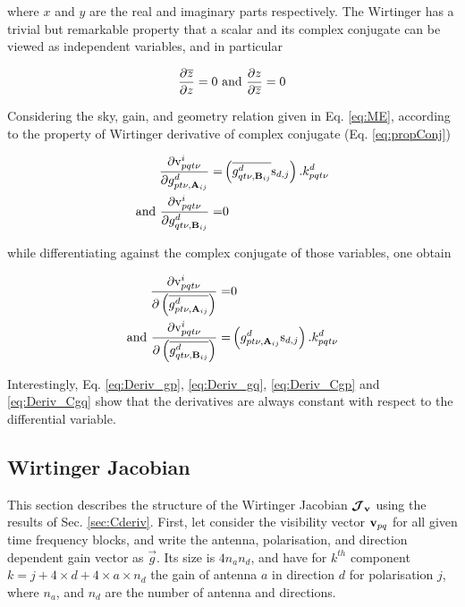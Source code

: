 \noindent where $x$ and $y$ are the real and imaginary parts
respectively. The
Wirtinger has a trivial but remarkable property that a scalar and its
complex conjugate can be viewed as independent variables, and in
particular


\begin{equation}
\label{eq:propConj}
\frac{\partial \overline{z}}{\partial z}=0
\text{ and }
\frac{\partial z}{\partial \overline{z}}=0
\end{equation}


Considering the sky, gain, and geometry relation given in
Eq. \ref{eq:ME}, according to the property of Wirtinger derivative of complex
conjugate (Eq. \ref{eq:propConj})

\begin{alignat}{3}
\label{eq:Deriv_gp}
\frac{\partial \mathrm{v}^i_{pqt\nu}}{\partial g^{d}_{pt\nu,\textbf{A}_{ij}}}=&
\left(\conj{g^{d}_{qt\nu,\textbf{B}_{ij}}}\text{s}_{d,j}\right).k^{d}_{pqt\nu}\\
\label{eq:Deriv_gq}
\text{and}\ 
\frac{\partial \mathrm{v}^i_{pqt\nu}}{\partial g^{d}_{qt\nu,\textbf{B}_{ij}}}=&0
\end{alignat}

\noindent while differentiating against the complex conjugate of those
variables, one obtain

\begin{alignat}{3}
\label{eq:Deriv_Cgp}
\frac{\partial \mathrm{v}^i_{pqt\nu}}{\partial \conjp{g^{d}_{pt\nu,\textbf{A}_{ij}}}}=&0\\
\label{eq:Deriv_Cgq}
\text{and}\ 
\frac{\partial \mathrm{v}^i_{pqt\nu}}{\partial \conjp{g^{d}_{qt\nu,\textbf{B}_{ij}}}}=&
\left(g^{d}_{pt\nu,\textbf{A}_{ij}}\text{s}_{d,j}\right).k^{d}_{pqt\nu}
\end{alignat}

Interestingly, Eq. \ref{eq:Deriv_gp},
\ref{eq:Deriv_gq}, \ref{eq:Deriv_Cgp} and \ref{eq:Deriv_Cgq} show that the
derivatives are always constant with respect to the differential
variable.

\subsection{Wirtinger Jacobian}
\label{sec:WirtingerJacob}

This section describes the structure of the Wirtinger Jacobian $\bm{\mathcal{J}}_{\textbf{v}}$ using the
results of Sec. \ref{sec:Cderiv}.
First, let consider the visibility vector $\textbf{v}_{pq}$
for all given time frequency blocks, and write the antenna,
polarisation, and direction dependent gain vector as
$\vec{g}$. Its size is $4n_an_d$, and have for $k^{th}$ component
$k=j+4\times d+4\times a \times n_d$ the gain of antenna $a$ in
direction $d$ for polarisation $j$, where $n_a$, and $n_d$ are the
number of antenna and directions.

